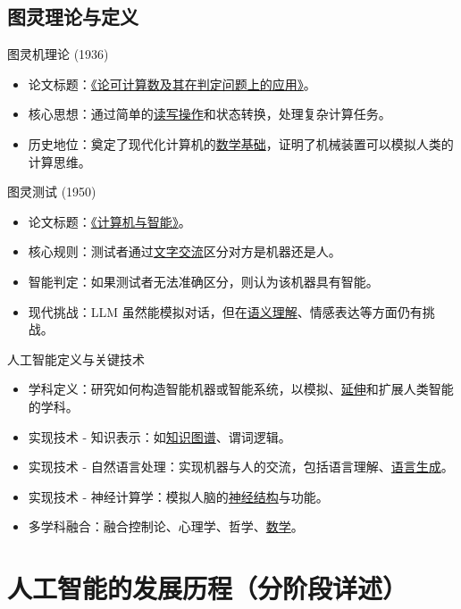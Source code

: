 \documentclass[11pt,a4paper]{ctexrep}
\newcommand{\fillblank}[1]{\underline{\hspace{2em}#1\hspace{2em}}}
\begin{document}
\section{图灵理论与定义}

\begin{qbox}{图灵机理论 (1936)}
    \begin{itemize}
        \item 论文标题：\fillblank{《论可计算数及其在判定问题上的应用》}。
        \item 核心思想：通过简单的\fillblank{读写操作}和状态转换，处理复杂计算任务。
        \item 历史地位：奠定了现代化计算机的\fillblank{数学基础}，证明了机械装置可以模拟人类的计算思维。
    \end{itemize}
\end{qbox}

\begin{qbox}{图灵测试 (1950)}
    \begin{itemize}
        \item 论文标题：\fillblank{《计算机与智能》}。
        \item 核心规则：测试者通过\fillblank{文字交流}区分对方是机器还是人。
        \item 智能判定：如果测试者无法准确区分，则认为该机器具有智能。
        \item 现代挑战：LLM 虽然能模拟对话，但在\fillblank{语义理解}、情感表达等方面仍有挑战。
    \end{itemize}
\end{qbox}

\begin{qbox}{人工智能定义与关键技术}
    \begin{itemize}
        \item 学科定义：研究如何构造智能机器或智能系统，以模拟、\fillblank{延伸}和扩展人类智能的学科。
        \item 实现技术 - 知识表示：如\fillblank{知识图谱}、谓词逻辑。
        \item 实现技术 - 自然语言处理：实现机器与人的交流，包括语言理解、\fillblank{语言生成}。
        \item 实现技术 - 神经计算学：模拟人脑的\fillblank{神经结构}与功能。
        \item 多学科融合：融合控制论、心理学、哲学、\fillblank{数学}。
    \end{itemize}
\end{qbox}

\chapter{人工智能的发展历程（分阶段详述）}
\end{document}
